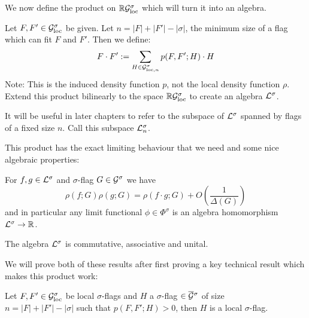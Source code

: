 We now define the product on $\mathbb{R}\mathcal{G}_\mathrm{loc}^\sigma$ which will turn it into an algebra.

\begin{definition}
    Let $F, F'\in\mathcal{G}_\mathrm{loc}^\sigma$ be given. Let $n=|F|+|F'|-|\sigma|$, the minimum size of
    a flag which can fit $F$ and $F'$. Then we define:
    \[
        F \cdot F' := \sum_{H \in \mathcal{G}_{\mathrm{loc},n}^\sigma} p(F, F'; H) \cdot H
    \]
    Note: This is the induced density function $p$, not the local density function $\rho$.
    Extend this product bilinearly to the space $\mathbb{R}\mathcal{G}_\mathrm{loc}^\sigma$ to create an algebra
    $\mathcal{L}^\sigma$.
\end{definition}

\begin{note}
    It will be useful in later chapters to refer to the subspace of $\mathcal{L}^\sigma$
    spanned by flags of a fixed size $n$. Call this subspace $\mathcal{L}^\sigma_n$.
\end{note}

This product has the exact limiting behaviour that we need and some nice algebraic
properties:

\begin{theorem}
    \label{thm:local_product_lim}
    For $f, g \in \mathcal{L}^\sigma$ and $\sigma$-flag $G\in\mathcal{G}^\sigma$ we have
    \[\rho(f; G)\rho(g; G) = \rho(f\cdot g; G) + O\left(\frac{1}{\Delta(G)}\right)\]
    and in particular any limit functional $\phi\in\Phi^\sigma$ is an algebra
    homomorphism $\mathcal{L}^\sigma \to \mathbb{R}$.
\end{theorem}

\begin{lemma}
    \label{lemma:local_assoc}
    The algebra $\mathcal{L}^\sigma$ is commutative, associative and unital.
\end{lemma}

We will prove both of these results after first proving a key technical result which makes this
product work:

\begin{theorem}
    Let $F, F' \in \mathcal{G}_\mathrm{loc}^\sigma$ be local $\sigma$-flags and $H$ a $\sigma$-flag
    $\in \overline{\mathcal{G}}{}^\sigma$
    of size\\ $n=|F|+|F'|-|\sigma|$ such that $p(F, F'; H) > 0$, then $H$ is a local
    $\sigma$-flag.
\end{theorem}

